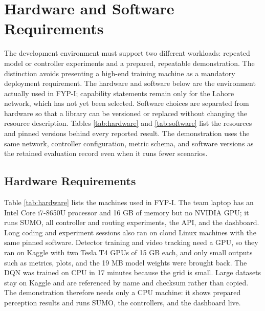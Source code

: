 \section{Hardware and Software Requirements}

The development environment must support two different workloads: repeated model or controller experiments and a prepared, repeatable demonstration. The distinction avoids presenting a high-end training machine as a mandatory deployment requirement. The hardware and software below are the environment actually used in FYP-I; capability statements remain only for the Lahore network, which has not yet been selected. Software choices are separated from hardware so that a library can be versioned or replaced without changing the resource description. Tables \ref{tab:hardware} and \ref{tab:software} list the resources and pinned versions behind every reported result. The demonstration uses the same network, controller configuration, metric schema, and software versions as the retained evaluation record even when it runs fewer scenarios.

\subsection{Hardware Requirements}

Table \ref{tab:hardware} lists the machines used in FYP-I. The team laptop has an Intel Core i7-8650U processor and 16 GB of memory but no NVIDIA GPU; it runs SUMO, all controller and routing experiments, the API, and the dashboard. Long coding and experiment sessions also ran on cloud Linux machines with the same pinned software. Detector training and video tracking need a GPU, so they ran on Kaggle with two Tesla T4 GPUs of 15 GB each, and only small outputs such as metrics, plots, and the 19 MB model weights were brought back. The DQN was trained on CPU in 17 minutes because the grid is small. Large datasets stay on Kaggle and are referenced by name and checksum rather than copied. The demonstration therefore needs only a CPU machine: it shows prepared perception results and runs SUMO, the controllers, and the dashboard live.

